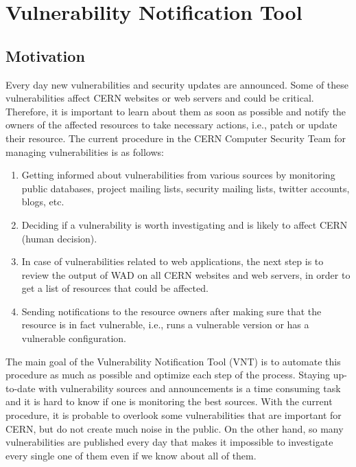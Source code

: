 \chapter{Vulnerability Notification Tool}
\label{vulnerability-notification-tool}
\thispagestyle{empty}

\section{Motivation}
Every day new vulnerabilities and security updates are announced. Some of these vulnerabilities affect CERN websites or web servers and could be critical. Therefore, it is important to learn about them as soon as possible and notify the owners of the affected resources to take necessary actions, i.e., patch or update their resource. The current procedure in the CERN Computer Security Team for managing vulnerabilities is as follows:
\begin{enumerate}
\item Getting informed about vulnerabilities from various sources by monitoring public databases, project mailing lists, security mailing lists, twitter accounts, blogs, etc.
\item Deciding if a vulnerability is worth investigating and is likely to affect CERN (human decision).
\item In case of vulnerabilities related to web applications, the next step is to review the output of WAD on all CERN websites and web servers, in order to get a list of resources that could be affected.
\item Sending notifications to the resource owners after making sure that the resource is in fact vulnerable, i.e., runs a vulnerable version or has a vulnerable configuration.
\end{enumerate}

The main goal of the Vulnerability Notification Tool (VNT) is to automate this procedure as much as possible and optimize each step of the process. Staying up-to-date with vulnerability sources and announcements is a time consuming task and it is hard to know if one is monitoring the best sources. With the current procedure, it is probable to overlook some vulnerabilities that are important for CERN, but do not create much noise in the public. 
On the other hand, so many vulnerabilities are published every day that makes it impossible to investigate every single one of them even if we know about all of them.

